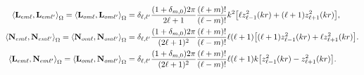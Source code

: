 %
\begin{align}
\ev{\vb{L}_{em\ell},\vb{L}_{em\ell'}}_\Omega = \ev{\vb{L}_{om\ell},\vb{L}_{om\ell'}}_\Omega &= 
		\delta_{\ell,\ell'}\frac{(1+\delta_{m,0})2\pi}{2\ell+1}\frac{(\ell+m)!}{(\ell-m)!}k^2\qty[ \ell z_{\ell-1}^2(kr) + (\ell+1)z_{\ell+1}^2(kr) ],\\
%
\ev{\vb{N}_{em\ell},\vb{N}_{em\ell'}}_\Omega = \ev{\vb{N}_{om\ell},\vb{N}_{om\ell'}}_\Omega &= \delta_{\ell,\ell'}\frac{(1+\delta_{m,0})2\pi}{(2\ell+1)^2}\frac{(\ell+m)!}{(\ell-m)!}\ell(\ell+1)\qty[ (\ell+1) z_{\ell-1}^2(kr) + \ell z_{\ell+1}^2(kr) ]. \\
\ev{\vb{L}_{em\ell},\vb{N}_{em\ell'}}_\Omega = \ev{\vb{L}_{om\ell},\vb{N}_{om\ell'}}_\Omega &= \delta_{\ell,\ell'}\frac{(1+\delta_{m,0})2\pi}{(2\ell+1)^2}\frac{(\ell+m)!}{(\ell-m)!}\ell(\ell+1)k\qty[ z_{\ell-1}^2(kr) - z_{\ell+1}^2(kr) ]. 
\end{align}
%























